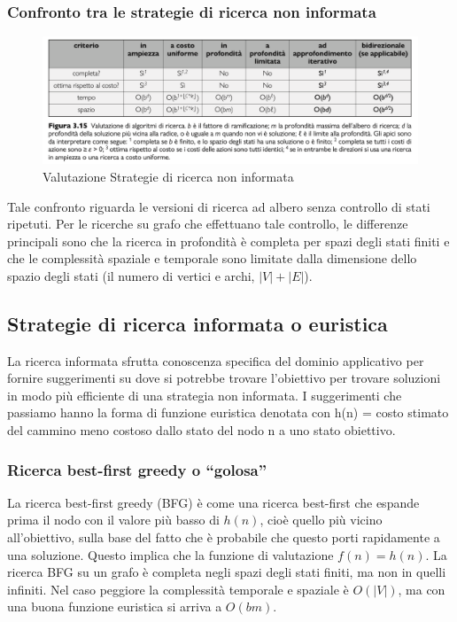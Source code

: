 \documentclass{article}
\begin{document}
\subsubsection{Confronto tra le strategie di ricerca non informata}
\begin{figure}[H]
    \centering
    \includegraphics[width=0.5\linewidth]{Images/ValutazioneAlgoritmmiRicercaNonInformata.png}
    \caption{Valutazione Strategie di ricerca non informata}
    \label{fig:enter-label}
\end{figure}
Tale confronto riguarda le versioni di ricerca ad albero senza controllo di stati ripetuti. Per le ricerche su grafo che effettuano tale controllo, le differenze principali sono che la ricerca in profondità è completa per spazi degli stati finiti e che le complessità spaziale e temporale sono limitate dalla dimensione dello spazio degli stati (il numero di vertici e archi, $|V| + |E|$).
\newpage
\subsection{Strategie di ricerca informata o euristica}
La ricerca informata sfrutta conoscenza specifica del dominio applicativo per fornire suggerimenti su dove si potrebbe trovare l'obiettivo per trovare soluzioni in modo più efficiente di una strategia non informata. I suggerimenti che passiamo hanno la forma di funzione euristica denotata con 
h(n) = costo stimato del cammino meno costoso dallo stato del nodo n a uno stato obiettivo.
\subsubsection{Ricerca best-first greedy o “golosa”}
La ricerca best-first greedy (BFG) è come una ricerca best-first che espande prima il nodo con il valore più basso di $h(n)$, cioè quello più vicino all'obiettivo, sulla base del fatto che è probabile che questo porti rapidamente a una soluzione. Questo implica che la funzione di valutazione $f(n) = h(n)$. La ricerca BFG su un grafo è completa negli spazi degli stati finiti, ma non in quelli infiniti. Nel caso peggiore la complessità temporale e spaziale è $O(|V|)$, ma con una buona funzione euristica si arriva a $O(bm)$.
\end{document}
